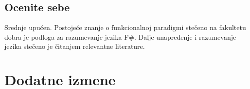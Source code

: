 \documentclass[a4paper]{report}
\begin{document}
\section{Ocenite sebe}
Srednje upućen. 
Postojeće znanje o funkcionalnoj paradigmi stečeno na fakultetu
 dobra je podloga za razumevanje jezika F\#.
Dalje unapređenje i razumevanje jezika stečeno je čitanjem relevantne literature.


\chapter{Dodatne izmene}
\end{document}
